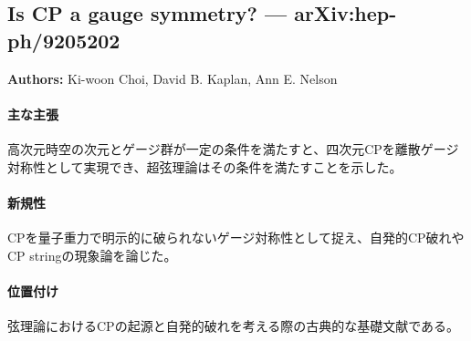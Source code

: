 \subsection{Is CP a gauge symmetry? --- arXiv:hep-ph/9205202}

\textbf{Authors:} Ki-woon Choi, David B. Kaplan, Ann E. Nelson

\paragraph{主な主張}
高次元時空の次元とゲージ群が一定の条件を満たすと、四次元CPを離散ゲージ対称性として実現でき、超弦理論はその条件を満たすことを示した\cite{Choi:1992xp}。

\paragraph{新規性}
CPを量子重力で明示的に破られないゲージ対称性として捉え、自発的CP破れやCP stringの現象論を論じた。

\paragraph{位置付け}
弦理論におけるCPの起源と自発的破れを考える際の古典的な基礎文献である。
